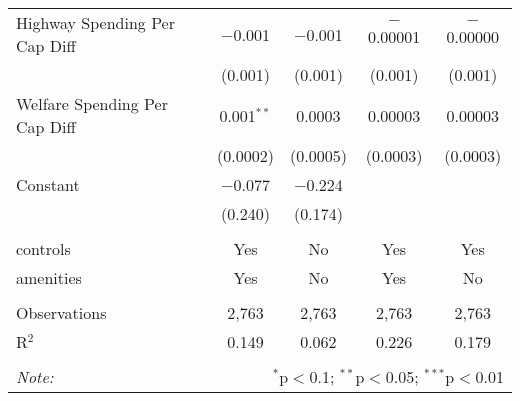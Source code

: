 \begin{table}[!htbp]
\begin{tabular}{@{\extracolsep{5pt}}lcccc}
  Highway Spending Per Cap Diff & $-$0.001 & $-$0.001 & $-$0.00001 & $-$0.00000 \\ 
  & (0.001) & (0.001) & (0.001) & (0.001) \\ 
  Welfare Spending Per Cap Diff & 0.001$^{**}$ & 0.0003 & 0.00003 & 0.00003 \\ 
  & (0.0002) & (0.0005) & (0.0003) & (0.0003) \\ 
  Constant & $-$0.077 & $-$0.224 &  &  \\ 
  & (0.240) & (0.174) &  &  \\ 
 \hline \\[-1.8ex] 
controls & Yes & No & Yes & Yes \\ 
amenities & Yes & No & Yes & No \\ 
\hline \\[-1.8ex] 
Observations & 2,763 & 2,763 & 2,763 & 2,763 \\ 
R$^{2}$ & 0.149 & 0.062 & 0.226 & 0.179 \\ 
\hline 
\hline \\[-1.8ex] 
\textit{Note:}  & \multicolumn{4}{r}{$^{*}$p$<$0.1; $^{**}$p$<$0.05; $^{***}$p$<$0.01} \\ 
\end{tabular} 
\end{table} 
